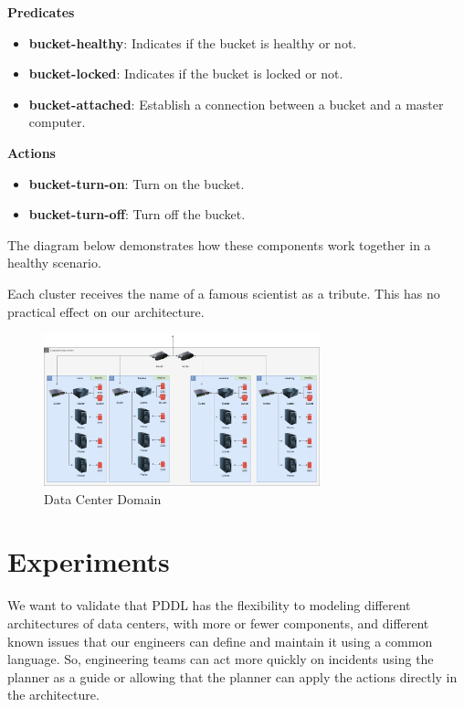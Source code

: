 \documentclass[letterpaper]{article}
\begin{document}
\textbf{Predicates}

\begin{itemize}
    \item \textbf{bucket-healthy}: Indicates if the bucket is healthy or not.
    \item \textbf{bucket-locked}: Indicates if the bucket is locked or not.
    \item \textbf{bucket-attached}: Establish a connection between a bucket and a master computer.
\end{itemize}

\textbf{Actions}

\begin{itemize}
    \item \textbf{bucket-turn-on}: Turn on the bucket.
    \item \textbf{bucket-turn-off}: Turn off the bucket.
\end{itemize}

The diagram below demonstrates how these components work together in a healthy scenario.

Each cluster receives the name of a famous scientist as a tribute. This has no practical effect on our architecture.

\begin{figure}[ht]
    \centering
    \includegraphics[width=8cm]{images/diagrams-healthy.png}
    \caption{Data Center Domain}
    \label{fig:data-center-domain}
\end{figure}

\section{Experiments}\label{sec:experiments}

We want to validate that PDDL has the flexibility to modeling different architectures of data centers, with more or fewer components, and different known issues that our engineers can define and maintain it using a common language. So, engineering teams can act more quickly on incidents using the planner as a guide or allowing that the planner can apply the actions directly in the architecture.
\end{document}
